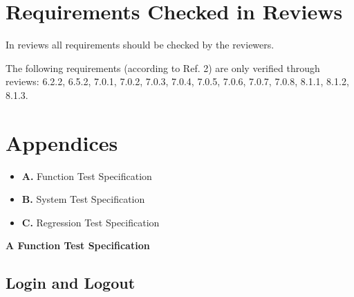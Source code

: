 \documentclass{article}
\begin{document}
\section{Requirements Checked in Reviews}
In reviews all requirements should be checked by the reviewers.

The following requirements (according to Ref. 2) are only verified through
reviews: 6.2.2, 6.5.2, 7.0.1, 7.0.2, 7.0.3, 7.0.4, 7.0.5, 7.0.6, 7.0.7, 7.0.8, 8.1.1, 8.1.2, 8.1.3.


\section{Appendices}
	\begin{itemize}
		\item \textbf{A.} Function Test Specification 
		\item \textbf{B.} System Test Specification 	
		\item \textbf{C.} Regression Test Specification 
		\end{itemize}
	
	\newpage
		\begin{flushleft}
		{\large \textbf{A Function Test Specification}}
		\end{flushleft}
		
		\subsection{Login and Logout}
		
\end{document}
